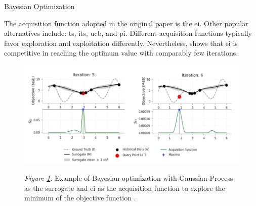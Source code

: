 \begin{algorithm}[t]
  \caption{Bayesian Optimization}
  \label{alg:BO}
 \end{algorithm}

\vspace{0.5em}
The acquisition function adopted in the original paper \cite{Mockus1978} is the \gls{ei}. Other popular alternatives include: \gls{ts}, \gls{its}, \gls{ucb}, and \gls{pi}. Different acquisition functions typically favor exploration and exploitation differently. Nevertheless, \cite{agnihotri2020exploring} shows that \gls{ei} is competitive in reaching the optimum value with comparably few iterations. 

\begin{figure}[htbp]
	\centering
	\includegraphics[scale=0.4]{figs/overview_bo.png}
	\label{fig: bo}
	\parbox{\linewidth}{
	\vspace{0.5em}
 	{\small \textit{Figure \ref{fig: bo}:} Example of Bayesian optimization with Gaussian Process as the surrogate and \gls{ei} as the acquisition function to explore the minimum of the objective function \cite{agnihotri2020exploring}.
 	}
 	}
\end{figure}

